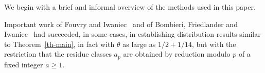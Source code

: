 \documentclass[12pt,a4paper,reqno]{amsart}
\numberwithin{equation}{section}
\theoremstyle{plain}
\theoremstyle{definition}
\newcommand\B{\operatorname{B}}
\begin{document}
We begin with a brief and informal overview of the methods used in
this paper.
\par
Important work of Fouvry and Iwaniec~\cite{fi, fi-2} and of Bombieri,
Friedlander and Iwaniec~\cite{bfi,bfi-2, bfi-3} had succeeded, in some
cases, in establishing distribution results similar to
Theorem~\ref{th-main}, in fact with $\theta$ as large as $1/2+1/14$,
but with the restriction that the residue classes $a_p$ are obtained
by reduction modulo $p$ of a fixed integer $a\geq 1$.
\end{document}
